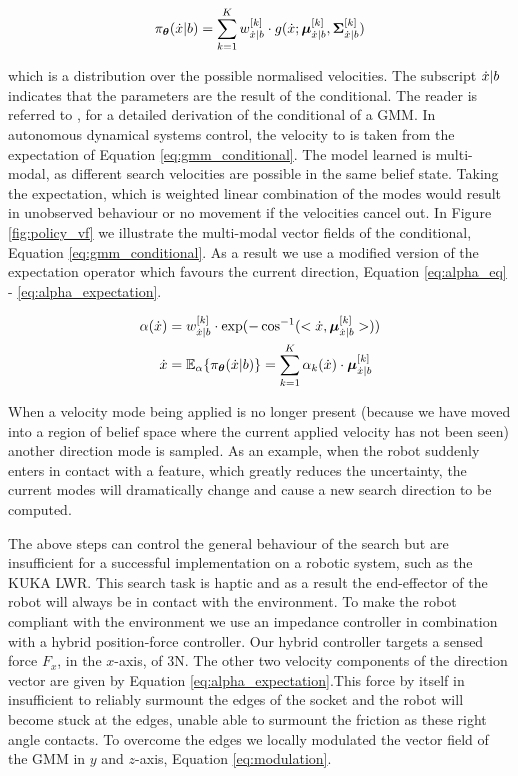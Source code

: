 \begin{equation}\label{eq:gmm_conditional}
 \pi_{\boldsymbol{\theta}}(\dot{x}|b) = \sum_{k=1}^{K} w^{[k]}_{\dot{x}|b} \cdot g(\dot{x};\boldsymbol{\mu}^{[k]}_{\dot{x}|b},\boldsymbol{\Sigma}^{[k]}_{\dot{x}|b})
\end{equation}

which is a distribution over the possible normalised velocities. The subscript $\dot{x}|b$ indicates that the parameters 
are the result of the conditional. The reader is referred to \cite{gesture_calinon_2010},\cite{gmr_2004} for 
a detailed derivation of the conditional of a GMM. In autonomous
dynamical systems control, the velocity to is taken from 
the expectation of Equation \ref{eq:gmm_conditional}. The model 
learned is multi-modal, as different search velocities are possible 
in the same belief state. Taking the expectation, which is weighted 
linear combination of the modes would result in unobserved behaviour or 
no movement if the velocities cancel out. In Figure \ref{fig:policy_vf}
we illustrate the multi-modal vector fields of the conditional, Equation \ref{eq:gmm_conditional}.
As a result we use a modified version of the expectation operator which favours the current
direction, Equation \ref{eq:alpha_eq} - \ref{eq:alpha_expectation}.

\begin{align}
 \alpha(\dot{x}) &= w^{[k]}_{\dot{x}|b} \cdot \exp(-\cos^{-1}(<\dot{x},\boldsymbol{\mu}^{[k]}_{\dot{x}|b}>)) \label{eq:alpha_eq}\\
 \dot{x} &= \mathbb{E}_{\alpha}\{\pi_{\boldsymbol{\theta}}(\dot{x}|b)\} = \sum_{k=1}^K \alpha_k(\dot{x}) \cdot \boldsymbol{\mu}^{[k]}_{\dot{x}|b} \label{eq:alpha_expectation}
\end{align}

When a velocity mode being applied is no longer present (because we have moved into a region of belief space where the current applied 
velocity has not been seen) another direction mode is sampled. As an example, when the robot suddenly enters in contact with a feature,
which greatly reduces the uncertainty, the current modes will dramatically change and cause a new search direction to be computed. 

The above steps can control the general behaviour of the search but are insufficient for a successful implementation on a robotic system, 
such as the KUKA LWR.
This search task is haptic and as a result the end-effector of the robot will always be in contact with the environment. To make the robot
compliant with the environment we use an impedance controller in combination with a hybrid position-force controller. Our hybrid controller
targets a sensed force $F_x$, in the $x$-axis, of 3N. The other two velocity components of the direction vector are given by 
Equation \ref{eq:alpha_expectation}.This force by itself in insufficient to reliably surmount the edges of the socket and the robot 
will become stuck at the edges, unable able to surmount the friction as these right angle contacts. To overcome the edges we locally modulated 
the vector field of the GMM in $y$ and $z$-axis, Equation \ref{eq:modulation}.

